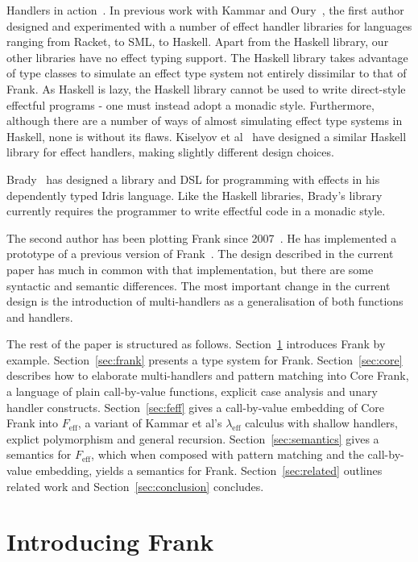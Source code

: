 \documentclass[preprint]{sigplanconf}
\newcommand{\lameff}{$\lambda_\mathrm{eff}$\xspace}
\newcommand{\feff}{$F_\textrm{eff}$\xspace}
\begin{document}
Handlers in action~\cite{KammarLO13}. In previous work with Kammar and
Oury~\cite{KammarLO13}, the first author designed and experimented
with a number of effect handler libraries for languages ranging from
Racket, to SML, to Haskell. Apart from the Haskell library, our other
libraries have no effect typing support. The Haskell library takes
advantage of type classes to simulate an effect type system not
entirely dissimilar to that of Frank. As Haskell is lazy, the Haskell
library cannot be used to write direct-style effectful programs - one
must instead adopt a monadic style. Furthermore, although there are a
number of ways of almost simulating effect type systems in Haskell,
none is without its flaws. Kiselyov et al~\cite{KiselyovSS13} have
designed a similar Haskell library for effect handlers, making
slightly different design choices.

Brady~\cite{Brady13} has designed a library and DSL for programming
with effects in his dependently typed Idris language. Like the Haskell
libraries, Brady's library currently requires the programmer to write
effectful code in a monadic style.

The second author has been plotting Frank since
2007~\cite{McBride07}. He has implemented a prototype of a previous
version of Frank~\cite{McBride12}. The design described in the current
paper has much in common with that implementation, but there are some
syntactic and semantic differences. The most important change in the
current design is the introduction of multi-handlers as a
generalisation of both functions and handlers.

The rest of the paper is structured as follows.
%
Section~\ref{sec:examples} introduces Frank by
example. Section~\ref{sec:frank} presents a type system for
Frank. Section~\ref{sec:core} describes how to elaborate
multi-handlers and pattern matching into Core Frank, a language of
plain call-by-value functions, explicit case analysis and unary
handler constructs. Section~\ref{sec:feff} gives a call-by-value
embedding of Core Frank into \feff, a variant of Kammar et al's
\lameff calculus with shallow handlers, explict polymorphism and
general recursion. Section~\ref{sec:semantics} gives a semantics for
\feff, which when composed with pattern matching and the call-by-value
embedding, yields a semantics for Frank. Section~\ref{sec:related}
outlines related work and Section~\ref{sec:conclusion} concludes.

\section{Introducing Frank}
\label{sec:examples}
\end{document}
